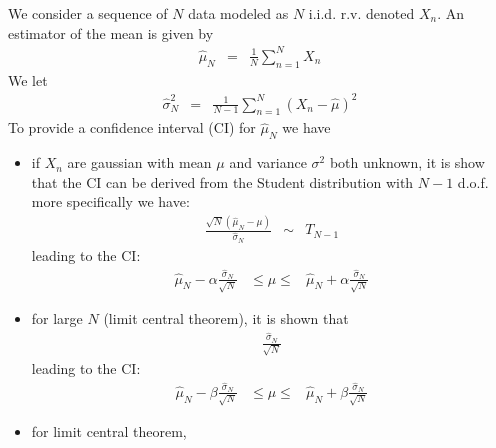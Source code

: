 We consider a sequence of $N$ data modeled as $N$ i.i.d. r.v. denoted $X_{n}$. An estimator of the mean is given by
\begin{eqnarray*}
\hat \mu_{N} &=&\frac{1}{N}\sum_{n=1}^{N}X_{n}
\end{eqnarray*}
We let
\begin{eqnarray*}
\hat\sigma_{N}^{2} &=& \frac{1}{N-1}\sum_{n=1}^{N}(X_{n}-\hat \mu)^{2}
\end{eqnarray*}
To provide a confidence interval (CI) for $\hat\mu_{N}$ we have
\begin{itemize}
\item
if $X_{n}$ are gaussian with mean $\mu$ and variance $\sigma^{2}$ both unknown, it is show that the CI can be derived from the Student distribution with $N-1$ d.o.f. more specifically we have:
\begin{eqnarray*}
\frac{\sqrt{N}(\hat \mu_{N} -\mu)}{\hat\sigma_{N}}&\sim&T_{N-1}
\end{eqnarray*}
leading to the CI:
\begin{eqnarray*}
\hat\mu_{N}-\alpha\frac{\hat\sigma_{N}}{\sqrt{N}}
&
 \leq\mu\leq
&
\hat\mu_{N}+\alpha\frac{\hat\sigma_{N}}{\sqrt{N}}
\end{eqnarray*}

\item
for large $N$ (limit central theorem), it is shown that 
\begin{eqnarray*}
\frac{\hat\sigma_{N}}{\sqrt{N}}
\end{eqnarray*}
leading to the CI:
\begin{eqnarray*}
\hat\mu_{N}-\beta\frac{\hat\sigma_{N}}{\sqrt{N}}
&
 \leq\mu\leq
&
\hat\mu_{N}+\beta\frac{\hat\sigma_{N}}{\sqrt{N}}
\end{eqnarray*}

\item
for limit central theorem, 
\end{itemize}








